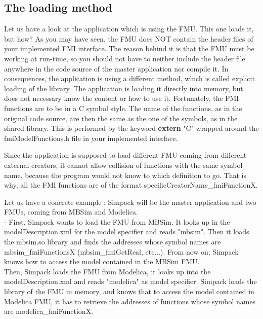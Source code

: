 \documentclass[10pt,a4paper]{report}
\begin{document}
\subsection*{The loading method}
Let us have a look at the application which is using the FMU. This one loads it, but how? As you may have seen, the FMU does NOT contain the header files of your implemented FMI interface. The reason behind it is that the FMU must be working at run-time, so you should not have to neither include the header file anywhere in the code source of the master application nor compile it. In consequences, the application is using a different method, which is called explicit loading of the library. The application is loading it directly into memory, but does not necessary know the content or how to use it. Fortunately, the FMI functions are to be in a C symbol style. The name of the functions, as in the original code source, are then the same as the one of the symbols, as in the shared library. This is performed by the keyword \textbf{extern} "C" wrapped around the fmiModelFunctions.h file in your implemented interface.\par
%
Since the application is supposed to load different FMU coming from different external creators, it cannot allow collision of functions with the same symbol name, because the program would not know to which definition to go. That is why, all the FMI functions are of the format specificCreatorName\_fmiFunctionX.\par
%
Let us have a concrete example : Simpack will be the master application and two FMUs, coming from MBSim and Modelica. \\-
First, Simpack wants to load the FMU from MBSim. It looks up in the modelDescription.xml for the model specifier and reads "mbsim". Then it loads the mbsim.so library and finds the addresses whose symbol names are mbsim\_fmiFunctionsX (mbsim\_fmiGetReal, etc...). From now on, Simpack knows how to access the model contained in the MBSim FMU. \\
Then, Simpack loads the FMU from Modelica, it looks up into the modelDescription.xml and reads "modelica" as model specifier. Simpack loads the library of the FMU in memory, and knows that to access the model contained in Modelica FMU, it has to retrieve the addresses of functions whose symbol names are modelica\_fmiFunctionX.
%
\end{document}
